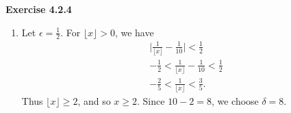 \documentclass[12pt]{article}
\begin{document}
\textbf{Exercise 4.2.4}
\begin{enumerate}[label=(\alph*)]
    \item Let \( \epsilon = \frac{1}{2} \). For \( \lfloor x \rfloor  > 0 \),  we have
          \[
              \begin{split}
                  \vert \frac{1}{\lfloor x \rfloor } - \frac{1}{10} \vert < \frac{1}{2}    \\
                  -\frac{1}{2} < \frac{1}{\lfloor x \rfloor } - \frac{1}{10} < \frac{1}{2} \\
                  -\frac{2}{5} < \frac{1}{\lfloor x \rfloor } < \frac{3}{5}.
              \end{split}
          \]
          Thus \( \lfloor x \rfloor \geq 2 \), and so \( x \geq 2 \). Since \( 10 - 2 = 8 \), we choose \( \delta  = 8 \).


\end{enumerate}
\end{document}
